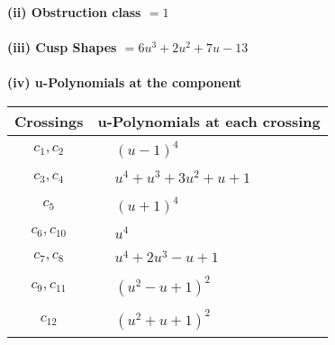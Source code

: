 \documentclass[1p]{elsarticle_modified}
\theoremstyle{definition}
\begin{document}
\flushleft \textbf{(ii) Obstruction class $= 1$}\\~\\
\flushleft \textbf{(iii) Cusp Shapes $= 6 u^3+2 u^2+7 u-13$}\\~\\
\newpage\renewcommand{\arraystretch}{1}
\flushleft \textbf{(iv) u-Polynomials at the component}\newline \\
\begin{tabular}{m{50pt}|m{274pt}}
Crossings & \hspace{64pt}u-Polynomials at each crossing \\
\hline $$\begin{aligned}c_{1},c_{2}\end{aligned}$$&$\begin{aligned}
&(u-1)^4
\end{aligned}$\\
\hline $$\begin{aligned}c_{3},c_{4}\end{aligned}$$&$\begin{aligned}
&u^4+u^3+3 u^2+u+1
\end{aligned}$\\
\hline $$\begin{aligned}c_{5}\end{aligned}$$&$\begin{aligned}
&(u+1)^4
\end{aligned}$\\
\hline $$\begin{aligned}c_{6},c_{10}\end{aligned}$$&$\begin{aligned}
&u^4
\end{aligned}$\\
\hline $$\begin{aligned}c_{7},c_{8}\end{aligned}$$&$\begin{aligned}
&u^4+2 u^3- u+1
\end{aligned}$\\
\hline $$\begin{aligned}c_{9},c_{11}\end{aligned}$$&$\begin{aligned}
&(u^2- u+1)^2
\end{aligned}$\\
\hline $$\begin{aligned}c_{12}\end{aligned}$$&$\begin{aligned}
&(u^2+u+1)^2
\end{aligned}$\\
\hline
\end{tabular}\\~\\
\end{document}

